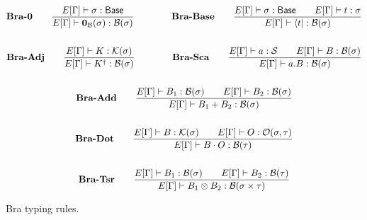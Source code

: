 \documentclass{article}
\begin{document}
\begin{figure}[h]
    \begin{gather*}
        \textbf{Bra-0} \qquad
        \frac{E[\Gamma] \vdash \sigma : \mathsf{Base}}{E[\Gamma] \vdash \mathbf{0}_\mathcal{B}(\sigma) : \mathcal{B}(\sigma)} 
        \qquad \qquad
        \textbf{Bra-Base} \qquad
        \frac{E[\Gamma] \vdash \sigma : \mathsf{Base} \qquad E[\Gamma]\vdash t : \sigma}{E[\Gamma] \vdash \bra{t} : \mathcal{B}(\sigma)} \\
        \\
        \textbf{Bra-Adj} \qquad
        \frac{E[\Gamma] \vdash K : \mathcal{K}(\sigma)}{E[\Gamma] \vdash K^\dagger : \mathcal{B}(\sigma)} 
        \qquad \qquad
        \textbf{Bra-Sca} \qquad
        \frac{E[\Gamma] \vdash a : \mathcal{S} \qquad E[\Gamma] \vdash B : \mathcal{B}(\sigma)}{E[\Gamma] \vdash a.B : \mathcal{B}(\sigma)} \\
        \\
        \textbf{Bra-Add} \qquad
        \frac{E[\Gamma] \vdash B_1 : \mathcal{B}(\sigma) \qquad E[\Gamma] \vdash B_2 : \mathcal{B}(\sigma)}{E[\Gamma] \vdash B_1 + B_2 : \mathcal{B}(\sigma)} \\
        \\
        \textbf{Bra-Dot} \qquad
        \frac{E[\Gamma] \vdash B : \mathcal{K}(\sigma) \qquad E[\Gamma] \vdash O : \mathcal{O}(\sigma, \tau)}{E[\Gamma] \vdash B \cdot O : \mathcal{B}(\tau)} \\
        \\
        \textbf{Bra-Tsr} \qquad
        \frac{E[\Gamma] \vdash B_1 : \mathcal{B}(\sigma) \qquad E[\Gamma] \vdash B_2 : \mathcal{B}(\tau)} {E[\Gamma] \vdash B_1 \otimes B_2 : \mathcal{B}(\sigma \times \tau)}
    \end{gather*}
    \caption{Bra typing rules.}
\end{figure}
\end{document}
